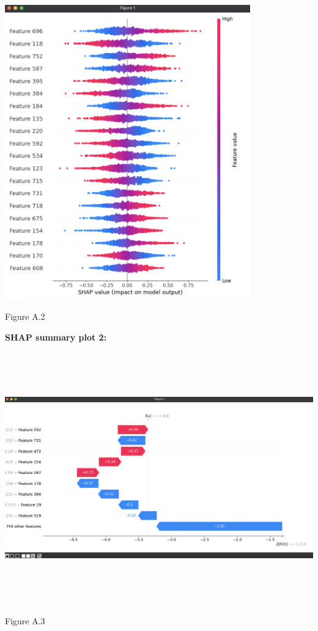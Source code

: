 \documentclass[
]{article}
\begin{document}
\includegraphics[width=4.17386in,height=5.02513in]{media/image2.png}

Figure A.2

\textbf{SHAP summary plot 2:}

\includegraphics[width=6.5in,height=4.28958in]{media/image3.png}

Figure A.3
\end{document}
